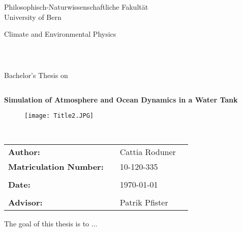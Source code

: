 \documentclass[12pt, a4paper]{article} %
\begin{document}
%

\thispagestyle{empty}
\begin{center}
\Large{Philosophisch-Naturwissenschaftliche Fakultät}\\
\Large{University of Bern}\\
\end{center}


\begin{center}
\Large{Climate and Environmental Physics}
\end{center}
\begin{verbatim}



\end{verbatim}
\begin{center}
\large{Bachelor's Thesis on}
\end{center}
\begin{verbatim}

\end{verbatim}
\begin{center}
\textbf{\Large{Simulation of Atmosphere and Ocean Dynamics in a Water Tank}}\\
\end{center}

\begin{figure}[h]
 \centering
 \texttt{[image: Title2.JPG]}
\end{figure}

\begin{verbatim}


\end{verbatim}

\begin{center}
\begin{tabular}{llll}

\textbf{Author:} & & Cattia Roduner& \\
\textbf{Matriculation Number:} & & 10-120-335& \\
& & &\\
\textbf{Date:} & & \today &\\
& & &\\
\textbf{Advisor:} & & Patrik Pfister &\\

\end{tabular}

\end{center}
\newpage
\thispagestyle{empty}
\mbox{}
\newpage
\abstract
The goal of this thesis is to ...
\end{document}
